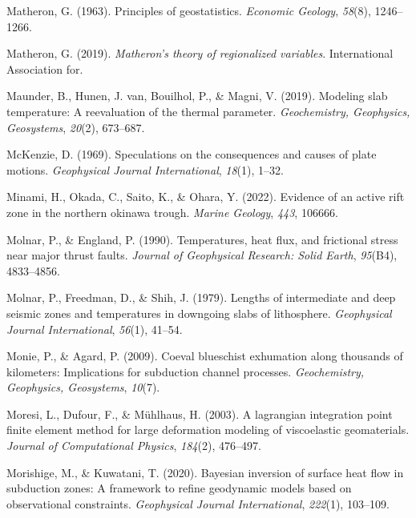 \begin{CSLReferences}{1}{1}
\leavevmode{}%
Matheron, G. (1963). Principles of geostatistics. \emph{Economic Geology}, \emph{58}(8), 1246--1266.

\leavevmode{}%
Matheron, G. (2019). \emph{Matheron's theory of regionalized variables}. International Association for.

\leavevmode{}%
Maunder, B., Hunen, J. van, Bouilhol, P., \& Magni, V. (2019). Modeling slab temperature: A reevaluation of the thermal parameter. \emph{Geochemistry, Geophysics, Geosystems}, \emph{20}(2), 673--687.

\leavevmode{}%
McKenzie, D. (1969). Speculations on the consequences and causes of plate motions. \emph{Geophysical Journal International}, \emph{18}(1), 1--32.

\leavevmode{}%
Minami, H., Okada, C., Saito, K., \& Ohara, Y. (2022). Evidence of an active rift zone in the northern okinawa trough. \emph{Marine Geology}, \emph{443}, 106666.

\leavevmode{}%
Molnar, P., \& England, P. (1990). Temperatures, heat flux, and frictional stress near major thrust faults. \emph{Journal of Geophysical Research: Solid Earth}, \emph{95}(B4), 4833--4856.

\leavevmode{}%
Molnar, P., Freedman, D., \& Shih, J. (1979). Lengths of intermediate and deep seismic zones and temperatures in downgoing slabs of lithosphere. \emph{Geophysical Journal International}, \emph{56}(1), 41--54.

\leavevmode{}%
Monie, P., \& Agard, P. (2009). Coeval blueschist exhumation along thousands of kilometers: Implications for subduction channel processes. \emph{Geochemistry, Geophysics, Geosystems}, \emph{10}(7).

\leavevmode{}%
Moresi, L., Dufour, F., \& Mühlhaus, H. (2003). A lagrangian integration point finite element method for large deformation modeling of viscoelastic geomaterials. \emph{Journal of Computational Physics}, \emph{184}(2), 476--497.

\leavevmode{}%
Morishige, M., \& Kuwatani, T. (2020). Bayesian inversion of surface heat flow in subduction zones: A framework to refine geodynamic models based on observational constraints. \emph{Geophysical Journal International}, \emph{222}(1), 103--109.


\end{CSLReferences}
